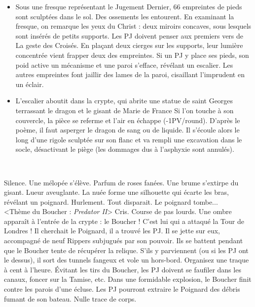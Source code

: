 \documentclass[11pt,twoside,a4paper]{book}
\begin{document}
\setlength\parindent{20pt}
\begin{itemize}
	\item Sous une fresque repr{\'e}sentant le Jugement Dernier, 66 empreintes de pieds sont sculpt{\'e}es dans le sol. Des ossements les entourent. En examinant la fresque, on remarque les yeux du Christ : deux miroirs concaves, sous lesquels sont ins{\'e}r{\'e}s de petits supports. Les PJ doivent penser aux premiers vers de La geste des Crois{\'e}s. En pla\c{c}ant deux cierges sur les supports, leur lumi{\`e}re concentr{\'e}e vient frapper deux des empreintes. Si un PJ y place ses pieds, son poid active un m{\'e}canisme et une paroi s'efface, r{\'e}v{\'e}lant un escalier. Les autres empreintes font jaillir des lames de la paroi, cisaillant l'imprudent en un {\'e}clair.
	\item L'escalier aboutit dans la crypte, qui abrite une statue de saint Georges terrassant le dragon et le gisant de Marie de France Si l'on touche {\`a} son couvercle, la pi{\`e}ce se referme et l'air en {\'e}chappe (-1PV/round). D'apr{\`e}s le po{\`e}me, il faut asperger le dragon de sang ou de liquide. Il s'{\'e}coule alors le long d'une rigole sculpt{\'e}e sur son flanc et va rempli une excavation dans le socle, d{\'e}sactivant le pi{\`e}ge (les dommages dus {\`a} l'asphyxie sont annul{\'e}s).
\end{itemize}~\\
\setlength\parindent{0pt}

Silence. Une m{\'e}lop{\'e}e s'{\'e}l{\`e}ve. Parfum de roses fan{\'e}es. Une brume s'extirpe du gisant. Lueur aveuglante. La nu{\'e}e forme une silhouette qui {\'e}carte les bras, r{\'e}v{\'e}lant un poignard. Hurlement. Tout disparait. Le poignard tombe...~\\

<Th{\`e}me du Boucher : \emph{Predator II}> Cris. Course de pas lourds. Une ombre appara{\^i}t {\`a} l'entr{\'e}e de la crypte : le Boucher ! C'est lui qui a attaqu{\'e} la Tour de Londres ! Il cherchait le Poignard, il a trouv{\'e} les PJ. Il se jette sur eux, accompagn{\'e} de neuf Rippers subjugu{\'e}s par son pouvoir. Ils se battent pendant que le Boucher tente de r{\'e}cup{\'e}rer la relique. S'ils y parviennent (ou si les PJ ont le dessus), il sort des tunnels fangeux et vole un hors-bord. Organisez une traque {\`a} cent {\`a} l'heure. {\'E}vitant les tirs du Boucher, les PJ doivent se faufiler dans les canaux, foncer sur la Tamise, etc. Dans une formidable explosion, le Boucher finit contre les parois d'une {\'e}cluse. Les PJ pourront extraire le Poignard des d{\'e}bris fumant de son bateau. Nulle trace de corps.~\\
\end{document}
